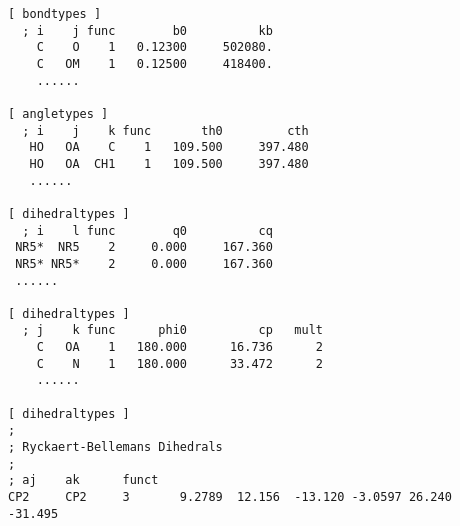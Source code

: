 {\small 
\begin{verbatim}
[ bondtypes ]
  ; i    j func        b0          kb
    C    O    1   0.12300     502080.
    C   OM    1   0.12500     418400.
    ......

[ angletypes ]
  ; i    j    k func       th0         cth
   HO   OA    C    1   109.500     397.480
   HO   OA  CH1    1   109.500     397.480
   ......

[ dihedraltypes ]
  ; i    l func        q0          cq
 NR5*  NR5    2     0.000     167.360
 NR5* NR5*    2     0.000     167.360
 ......

[ dihedraltypes ]
  ; j    k func      phi0          cp   mult
    C   OA    1   180.000      16.736      2
    C    N    1   180.000      33.472      2
    ......

[ dihedraltypes ]
;
; Ryckaert-Bellemans Dihedrals
;
; aj    ak      funct
CP2     CP2     3       9.2789  12.156  -13.120 -3.0597 26.240  -31.495
\end{verbatim}}





